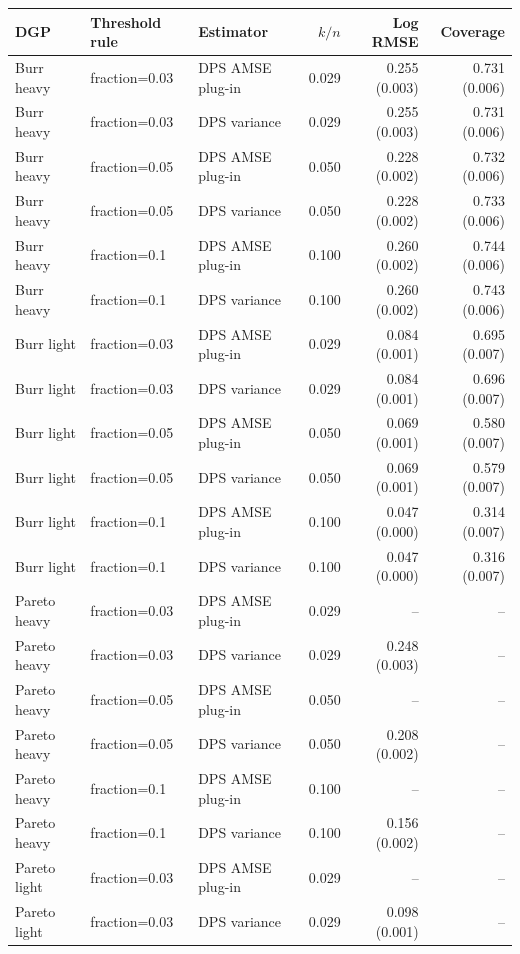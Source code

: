 \begin{tabular}{lllrrr}
\toprule
DGP & Threshold rule & Estimator & $k/n$ & Log RMSE & Coverage \\
\midrule
Burr heavy & fraction=0.03 & DPS AMSE plug-in & 0.029 & 0.255 (0.003) & 0.731 (0.006) \\
Burr heavy & fraction=0.03 & DPS variance & 0.029 & 0.255 (0.003) & 0.731 (0.006) \\
Burr heavy & fraction=0.05 & DPS AMSE plug-in & 0.050 & 0.228 (0.002) & 0.732 (0.006) \\
Burr heavy & fraction=0.05 & DPS variance & 0.050 & 0.228 (0.002) & 0.733 (0.006) \\
Burr heavy & fraction=0.1 & DPS AMSE plug-in & 0.100 & 0.260 (0.002) & 0.744 (0.006) \\
Burr heavy & fraction=0.1 & DPS variance & 0.100 & 0.260 (0.002) & 0.743 (0.006) \\
Burr light & fraction=0.03 & DPS AMSE plug-in & 0.029 & 0.084 (0.001) & 0.695 (0.007) \\
Burr light & fraction=0.03 & DPS variance & 0.029 & 0.084 (0.001) & 0.696 (0.007) \\
Burr light & fraction=0.05 & DPS AMSE plug-in & 0.050 & 0.069 (0.001) & 0.580 (0.007) \\
Burr light & fraction=0.05 & DPS variance & 0.050 & 0.069 (0.001) & 0.579 (0.007) \\
Burr light & fraction=0.1 & DPS AMSE plug-in & 0.100 & 0.047 (0.000) & 0.314 (0.007) \\
Burr light & fraction=0.1 & DPS variance & 0.100 & 0.047 (0.000) & 0.316 (0.007) \\
Pareto heavy & fraction=0.03 & DPS AMSE plug-in & 0.029 & -- & -- \\
Pareto heavy & fraction=0.03 & DPS variance & 0.029 & 0.248 (0.003) & -- \\
Pareto heavy & fraction=0.05 & DPS AMSE plug-in & 0.050 & -- & -- \\
Pareto heavy & fraction=0.05 & DPS variance & 0.050 & 0.208 (0.002) & -- \\
Pareto heavy & fraction=0.1 & DPS AMSE plug-in & 0.100 & -- & -- \\
Pareto heavy & fraction=0.1 & DPS variance & 0.100 & 0.156 (0.002) & -- \\
Pareto light & fraction=0.03 & DPS AMSE plug-in & 0.029 & -- & -- \\
Pareto light & fraction=0.03 & DPS variance & 0.029 & 0.098 (0.001) & -- \\

\end{tabular}
